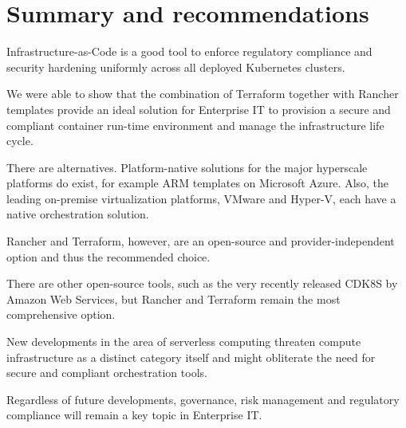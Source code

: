 %
%

\pagebreak
\section{Summary and recommendations}

\onehalfspacing

Infrastructure-as-Code is a good tool to enforce regulatory compliance and security hardening uniformly across all deployed Kubernetes clusters.

We were able to show that the combination of Terraform together with Rancher templates provide an ideal solution for Enterprise IT to provision a secure and compliant container run-time environment and manage the infrastructure life cycle.

There are alternatives. Platform-native solutions for the major hyperscale platforms do exist, for example ARM templates on Microsoft Azure. Also, the leading on-premise virtualization platforms, VMware and Hyper-V, each have a native orchestration solution.

Rancher and Terraform, however, are an open-source and provider-independent
option and thus the recommended choice.

There are other open-source tools, such as the very recently released CDK8S by Amazon Web Services, but Rancher and Terraform remain the most comprehensive option.

New developments in the area of serverless computing threaten compute infrastructure as a distinct category itself and might obliterate the need for secure and compliant orchestration tools.

Regardless of future developments, governance, risk management and regulatory compliance will remain a key topic in Enterprise IT.
